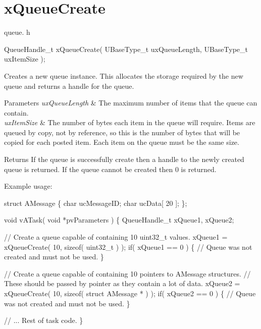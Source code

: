 \hypertarget{group__x_queue_create}{}\section{x\+Queue\+Create}
\label{group__x_queue_create}
queue. h 
\begin{DoxyPre}
QueueHandle\_t xQueueCreate(
                          UBaseType\_t uxQueueLength,
                          UBaseType\_t uxItemSize
                      );
  \end{DoxyPre}


Creates a new queue instance. This allocates the storage required by the new queue and returns a handle for the queue.


\begin{DoxyParams}{Parameters}
{\em ux\+Queue\+Length} & The maximum number of items that the queue can contain.\\
\hline
{\em ux\+Item\+Size} & The number of bytes each item in the queue will require. Items are queued by copy, not by reference, so this is the number of bytes that will be copied for each posted item. Each item on the queue must be the same size.\\
\hline
\end{DoxyParams}
\begin{DoxyReturn}{Returns}
If the queue is successfully create then a handle to the newly created queue is returned. If the queue cannot be created then 0 is returned.
\end{DoxyReturn}
Example usage\+: 
\begin{DoxyPre}
struct AMessage
\{
   char ucMessageID;
   char ucData[ 20 ];
\};\end{DoxyPre}



\begin{DoxyPre}void vATask( void *pvParameters )
\{
QueueHandle\_t xQueue1, xQueue2;\end{DoxyPre}



\begin{DoxyPre}   // Create a queue capable of containing 10 uint32\_t values.
   xQueue1 = xQueueCreate( 10, sizeof( uint32\_t ) );
   if( xQueue1 == 0 )
   \{
    // Queue was not created and must not be used.
   \}\end{DoxyPre}



\begin{DoxyPre}   // Create a queue capable of containing 10 pointers to AMessage structures.
   // These should be passed by pointer as they contain a lot of data.
   xQueue2 = xQueueCreate( 10, sizeof( struct AMessage * ) );
   if( xQueue2 == 0 )
   \{
    // Queue was not created and must not be used.
   \}\end{DoxyPre}



\begin{DoxyPre}   // ... Rest of task code.
\}
\end{DoxyPre}
 